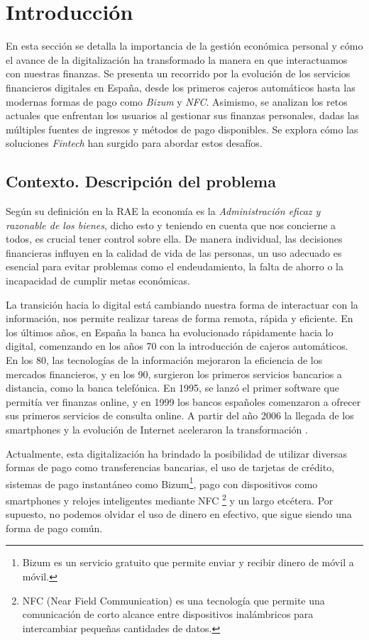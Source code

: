 \chapter{Introducción}
En esta sección se detalla la importancia de la gestión económica personal y cómo el avance de la digitalización ha transformado la manera en que interactuamos con nuestras finanzas. Se presenta un recorrido por la evolución de los servicios financieros digitales en España, desde los primeros cajeros automáticos hasta las modernas formas de pago como \textit{Bizum} y \textit{NFC}. Asimismo, se analizan los retos actuales que enfrentan los usuarios al gestionar sus finanzas personales, dadas las múltiples fuentes de ingresos y métodos de pago disponibles. Se explora cómo las soluciones \textit{Fintech} han surgido para abordar estos desafíos.

\section{Contexto. Descripción del problema} 
Según su definición en la RAE\cite{rae_economia} la economía es la 
\textit{Administración eficaz y razonable de los bienes}, dicho esto y teniendo en 
cuenta que nos concierne a todos, es crucial tener control sobre ella. 
De manera individual, las decisiones financieras influyen en la calidad de vida de las personas,
un uso adecuado es esencial para evitar problemas como el endeudamiento, la 
falta de ahorro o la incapacidad de cumplir metas económicas.

La transición hacia lo digital está cambiando nuestra forma de interactuar con la información, nos permite realizar tareas de forma remota, rápida y eficiente. 
En los últimos años, en España la banca ha evolucionado rápidamente hacia lo digital, comenzando en los años 70 con la introducción de cajeros automáticos. En los 80, las tecnologías de la información mejoraron la eficiencia de los mercados financieros, y en los 90, surgieron los primeros servicios bancarios a distancia, como la banca telefónica. En 1995, se lanzó el primer software que permitía ver finanzas online, y en 1999 los bancos españoles comenzaron a ofrecer sus primeros servicios de consulta online. A partir del año 2006 la llegada de los smartphones y la evolución de Internet aceleraron la transformación \cite{hebrero2022fintech}.

Actualmente, esta digitalización ha brindado la posibilidad de utilizar diversas formas de pago como transferencias bancarias, el uso de tarjetas de crédito, sistemas de pago instantáneo como Bizum\footnote{Bizum es un servicio gratuito que permite enviar y recibir dinero de móvil a móvil.}, pago con dispositivos como smartphones y relojes inteligentes mediante NFC \footnote{NFC (Near Field Communication) es una tecnología que permite una comunicación de corto alcance entre dispositivos inalámbricos para intercambiar pequeñas cantidades de datos.} y un largo etcétera. Por supuesto, no podemos olvidar el uso de dinero en efectivo, que sigue siendo una forma de pago común. 

